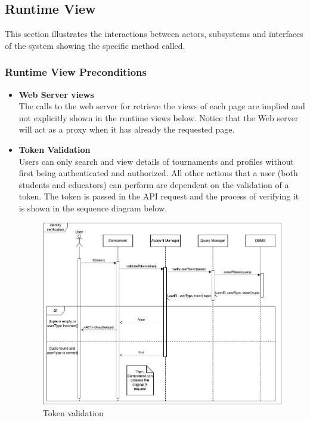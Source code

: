 \subsection{Runtime View}
This section illustrates the interactions between actors, subsystems and interfaces of the system showing the specific method called.
\subsubsection{Runtime View Preconditions}{
    \begin{itemize}
        \item \textbf{Web Server views}\\
        The calls to the web server for retrieve the views of each page are implied and not explicitly shown in the runtime views below. 
        Notice that the Web server will act as a proxy when it has already the requested page.
        \item \textbf{Token Validation}\\
        Users can only search and view details of  tournaments and profiles without first being authenticated and authorized. All other actions that a user (both students and educators) can perform are dependent on the validation of a token. The token is passed in the API request and the process of verifying it is shown in the sequence diagram below.
        \begin{figure}[h]
            \centering
            \includegraphics[width=1\linewidth]{src/Token validation.png}
            \caption{Token validation}
            \label{fig:Token validation}
        \end{figure}
    \end{itemize}
}
